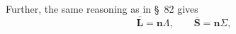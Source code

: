 Further, the same reasoning as in \S~82 gives
\begin{equation}\overline{\mathbf L}=\mathbf n\Lambda,\qquad \overline{\mathbf S}=\mathbf n\Sigma,\tag{83.4}\end{equation}
